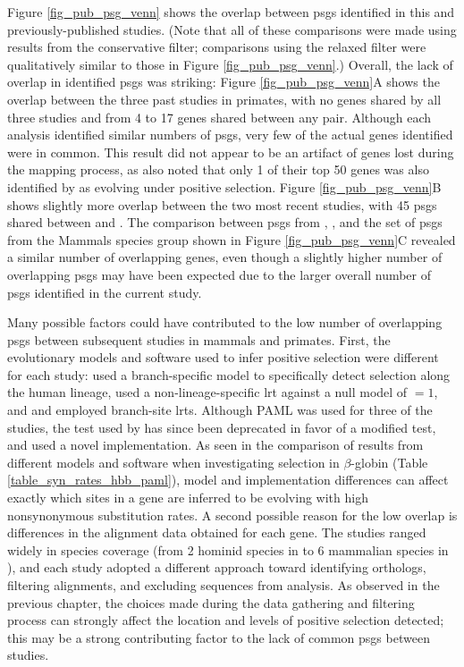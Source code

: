 Figure \ref{fig_pub_psg_venn} shows the overlap between \acp{psg}
identified in this and previously-published studies. (Note that all of
these comparisons were made using results from the conservative
filter; comparisons using the relaxed filter were qualitatively
similar to those in Figure \ref{fig_pub_psg_venn}.) Overall, the lack
of overlap in identified \acp{psg} was striking: Figure
\ref{fig_pub_psg_venn}A shows the overlap between the three past
studies in primates, with no genes shared by all three studies and
from 4 to 17 genes shared between any pair. Although each analysis
identified similar numbers of \acp{psg}, very few of the actual genes
identified were in common. This result did not appear to be an
artifact of genes lost during the mapping process, as
\citet{Nielsen2005} also noted that only 1 of their top 50 genes was
also identified by \citet{Clark2003} as evolving under positive
selection. Figure \ref{fig_pub_psg_venn}B shows slightly more overlap
between the two most recent studies, with 45 \acp{psg} shared between
\citet{Kosiol2008} and \citet{Macaque2007}. The comparison between
\acp{psg} from \citet{Nielsen2005}, \citet{Kosiol2008}, and the set of
\psgeone \acp{psg} from the Mammals species group shown in Figure
\ref{fig_pub_psg_venn}C revealed a similar number of overlapping
genes, even though a slightly higher number of overlapping \acp{psg}
may have been expected due to the larger overall number of \acp{psg}
identified in the current study.


Many possible factors could have contributed to the low number of
overlapping \acp{psg} between subsequent studies in mammals and
primates. First, the evolutionary models and software used to infer
positive selection were different for each study: \citet{Clark2003}
used a branch-specific model to specifically detect selection along
the human lineage, \citet{Nielsen2005} used a non-lineage-specific
\ac{lrt} against a null model of \dnds$=1$, and \citet{Macaque2007}
and \citet{Kosiol2008} employed branch-site \acp{lrt}. Although PAML
was used for three of the studies, the test used by \citet{Clark2003}
has since been deprecated in favor of a modified test, and
\citet{Kosiol2008} used a novel implementation. As seen in the
comparison of results from different models and software when
investigating selection in $\beta$-globin (Table
\ref{table_syn_rates_hbb_paml}), model and implementation differences
can affect exactly which sites in a gene are inferred to be evolving
with high nonsynonymous substitution rates. A second possible reason
for the low overlap is differences in the alignment data obtained for
each gene. The studies ranged widely in species coverage (from 2
hominid species in \citet{Nielsen2005} to 6 mammalian species in
\citet{Kosiol2008}), and each study adopted a different approach
toward identifying orthologs, filtering alignments, and excluding
sequences from analysis. As observed in the previous chapter, the
choices made during the data gathering and filtering process can
strongly affect the location and levels of positive selection
detected; this may be a strong contributing factor to the lack of
common \acp{psg} between studies.

